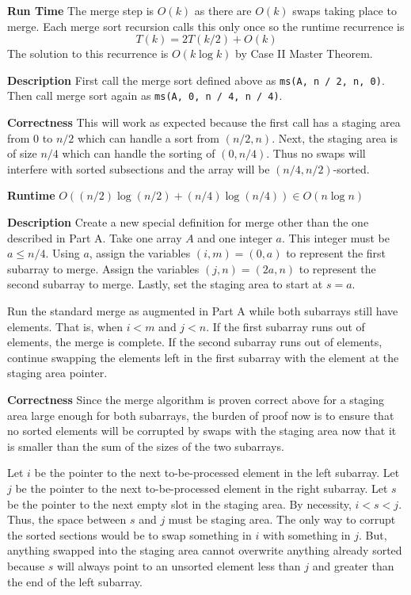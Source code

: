 \documentclass[12pt,twoside]{article}
\begin{document}
\begin{problems}
\begin{problemparts}
{\bf Run Time} The merge step is $O(k)$ as there are $O(k)$ swaps taking
place to merge. Each merge sort recursion calls this only once so the runtime
recurrence is
$$ T(k) = 2 T(k/2) + O(k) $$
The solution to this recurrence is $O(k \log k)$ by Case II Master Theorem.

\problempart %

{\bf Description} First call the merge sort defined above as {\tt ms(A, n / 2,
n, 0)}. Then call merge sort again as {\tt ms(A, 0, n / 4, n / 4)}.

{\bf Correctness} This will work as expected because the first call has a
staging area from $0$ to $n/2$ which can handle a sort from $(n/2, n)$. Next,
the staging area is of size $n / 4$ which can handle the sorting of $(0, n /
4)$. Thus no swaps will interfere with sorted subsections and the array will
be $(n/4, n/2)$-sorted.

{\bf Runtime} $O((n / 2) \log(n / 2) + (n / 4) \log (n / 4)) \in O(n \log n)$

\problempart %

{\bf Description} Create a new special definition for merge other than the
one described in Part A. Take one array $A$ and one integer $a$. This integer
must be $a \leq n / 4$. Using $a$, assign the variables $(i, m) = (0, a)$ to
represent the first subarray to merge. Assign the variables $(j, n) = (2a,
n)$ to represent the second subarray to merge. Lastly, set the staging area
to start at $s = a$.

Run the standard merge as augmented in Part A while both subarrays still have
elements. That is, when $i < m$ and $j < n$. If the first subarray runs out
of elements, the merge is complete. If the second subarray runs out of
elements, continue swapping the elements left in the first subarray with the
element at the staging area pointer.

{\bf Correctness} Since the merge algorithm is proven correct above for a
staging area large enough for both subarrays, the burden of proof now is to
ensure that no sorted elements will be corrupted by swaps with the staging
area now that it is smaller than the sum of the sizes of the two subarrays.

Let $i$ be the pointer to the next to-be-processed element in the left
subarray. Let $j$ be the pointer to the next to-be-processed element in the
right subarray. Let $s$ be the pointer to the next empty slot in the staging
area. By necessity, $i < s < j$. Thus, the space between $s$ and $j$ must be
staging area. The only way to corrupt the sorted sections would be to swap
something in $i$ with something in $j$. But, anything swapped into the
staging area cannot overwrite anything already sorted because $s$ will always
point to an unsorted element less than $j$ and greater than the end of the
left subarray.


\end{problemparts}
\end{problems}
\end{document}
